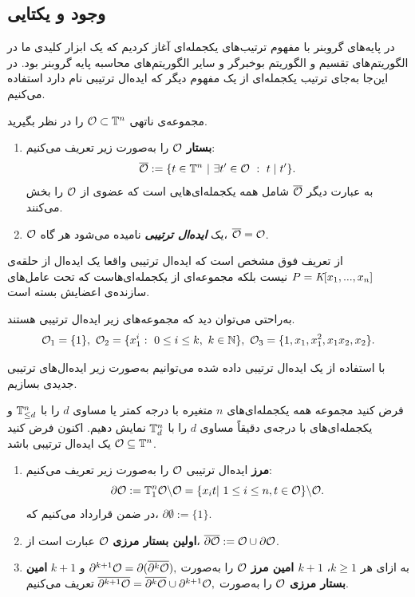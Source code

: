 \subsection*{وجود و یکتایی}
در پایه‌های گروبنر با مفهوم ترتیب‌های یکجمله‌ای آغاز کردیم که یک ابزار کلیدی ما در الگوریتم‌های تقسیم و الگوریتم بوخبرگر و سایر الگوریتم‌های محاسبه‌  پایه‌  گروبنر بود. در این‌جا به‌جای ترتیب یکجمله‌ای از یک مفهوم دیگر که ایده‌ال ترتیبی نام‌ دارد استفاده می‌کنیم. 

\begin{definition}
مجموعه‌ی ناتهی 
${\mathcal O}\subset {\mathbb{T}}^{n}$
را در نظر بگیرید.
\begin{enumerate}
\item
\textbf{بستار}
${\mathcal O}$
را به‌صورت زیر تعریف می‌کنیم:
$$\overline{\mO}:=\{t\in \tn \ | \ \exi t'\in\mO  \ : \ t\mid t' \}.$$
به عبارت دیگر 
$\overline{{\mathcal O}}$
شامل همه‌  یکجمله‌ای‌هایی است که عضوی از 
${\mathcal O}$
را بخش می‌کنند.
\item
${\mathcal O}$
یک 
\textbf{\textit{ایده‌ال ترتیبی }}
نامیده می‌شود هر گاه، 
$\overline{{\mathcal O}} = {\mathcal O}$.
\end{enumerate}
\end{definition}
از تعریف فوق مشخص است که ایده‌ال ترتیبی واقعا یک ایده‌ال از حلقه‌ی 
$P = \textit{K}[x_{1},...,x_{n}]$
نیست بلکه مجموعه‌ای از یکجمله‌ای‌هاست که تحت عامل‌های سازنده‌ی اعضایش بسته است. 
\begin{example}
به‌راحتی می‌توان دید که مجموعه‌های زیر ایده‌ال ترتیبی هستند.
$${\mathcal O}_{1} = \{1\}, \ {\mathcal O}_{2} = \{x_{1}^{i}: \ 0\leq i\leq k, \ k\in\mathbb{N}\}, \ {\mathcal O}_{3} = \{1,x_{1},x_{1}^{2},x_{1}x_{2},x_{2}\}.$$
\end{example}
با استفاده از یک ایده‌ال ترتیبی داده شده می‌توانیم به‌صورت زیر ایده‌ال‌های ترتیبی  جدیدی  بسازیم. 
\begin{definition}
	فرض کنید مجموعه‌  همه‌  یکجمله‌ای‌های 
	$n$
	متغیره با درجه‌  کمتر یا مساوی 
	$d$
	را با 
	${\mathbb{T}}^{n}_{\leq d}$
	و یکجمله‌ای‌های با درجه‌ی دقیقاً مساوی 
	$d$
	را با 
	${\mathbb{T}}^{n}_{d}$
نمایش دهیم. اکنون فرض کنید 
${\mathcal O}\subseteq {\mathbb{T}}^{n}$
یک ایده‌ال ترتیبی باشد.
\begin{enumerate}
\item
\textbf{مرز}
ایده‌ال ترتیبی 
${\mathcal O}$
را به‌صورت زیر تعریف می‌کنیم:
$$\po := \tn_{1}\mO\backslash \mO = \{x_{i}t| \ 1\leq i\leq n, t\in \mO \}\backslash \mO.$$
در ضمن قرارداد می‌کنیم که، 
$\partial\emptyset :=\{1\}$.
\item
\textbf{اولین بستار مرزی}
${\mathcal O}$
عبارت است از،
$\overline{\partial\mathcal{O}} := {\mathcal O}\cup \partial\mathcal{O}$.
\item
به ازای هر 
$k\geq 1$،
\textbf{$k+1$
امین مرز}
${\mathcal O}$
را به‌صورت
$\partial^{k+1}\mathcal{O} = \partial(\overline{\partial^{k}\mathcal{O}}),$
و 
$k+1$
\textbf{امین بستار مرزی }
${\mathcal O}$
را به‌صورت 
$\overline{\partial^{k+1}\mathcal{O}} = \overline{\partial^{k}\mathcal{O}}\cup\partial^{k+1}\mathcal{O},$
تعریف می‌کنیم.
\end{enumerate}
\end{definition}

